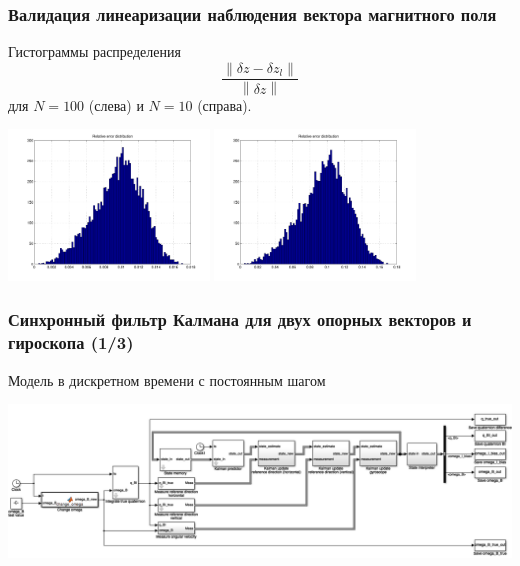 \documentclass[utf8]{beamer}
\newcommand{\norm}[1]{\left\lVert#1\right\rVert}
\begin{document}
\begin{frame}
\frametitle{Валидация линеаризации наблюдения вектора магнитного поля}
Гистограммы распределения 
$$
\frac{\norm{\delta z - \delta z_l}}{\norm{\delta z}}
$$
для $N = 100$ (слева) и $N=10$ (справа).
\begin{center}
\includegraphics[width=0.4\textwidth]{pic/lin_direction_001.pdf}    
\includegraphics[width=0.4\textwidth]{pic/lin_direction_01.pdf}    
\end{center}
\end{frame}
\begin{frame}
\frametitle{Синхронный фильтр Калмана для двух опорных векторов и гироскопа (1/3)}
Модель в дискретном времени с постоянным шагом
\begin{center}
    \includegraphics[width=\textwidth]{pic/kalman_gyro_sync.png}
\end{center}
\end{frame}
\end{document}
